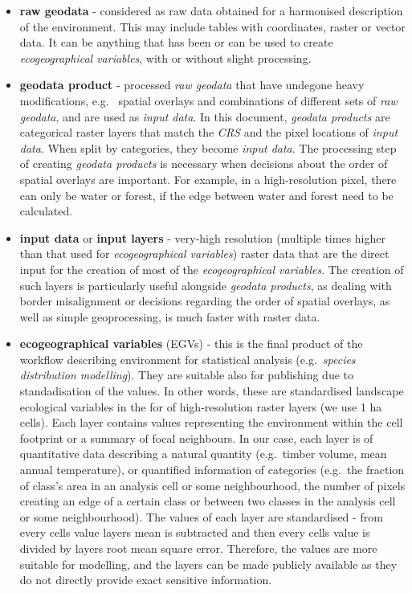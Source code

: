\documentclass[
]{book}
\begin{document}
\begin{itemize}
\item
  \textbf{raw geodata} - considered as raw data obtained for a harmonised description
  of the environment. This may include tables with coordinates, raster or vector data.
  It can be anything that has been or can be used to create \emph{ecogeographical variables},
  with or without slight processing.
\item
  \textbf{geodata product} - processed \emph{raw geodata} that have undegone heavy modifications, e.g.~
  spatial overlays and combinations of different sets of \emph{raw geodata}, and are used
  as \emph{input data}. In this document, \emph{geodata products} are categorical
  raster layers that match the \emph{CRS} and the pixel locations of \emph{input data}. When
  split by categories, they become \emph{input data}. The processing step of creating \emph{geodata products}
  is necessary when decisions about the order of spatial overlays are important. For example,
  in a high-resolution pixel, there can only be water or forest, if the edge between water and
  forest need to be calculated.
\item
  \textbf{input data} or \textbf{input layers} - very-high resolution (multiple times higher than that
  used for \emph{ecogeographical variables}) raster data that are the direct input for the creation
  of most of the \emph{ecogeographical variables}. The creation of such layers is particularly useful
  alongside \emph{geodata products}, as dealing with border misalignment or decisions regarding the
  order of spatial overlays, as well as simple geoprocessing, is much faster with raster
  data.
\item
  \textbf{ecogeographical variables} (EGVs) - this is the final product of the workflow
  describing environment for statistical analysis (e.g.~\emph{species distribution modelling}).
  They are suitable also for publishing due to standadisation of the values. In other
  words, these are standardised landscape ecological variables in the for of
  high-resolution raster layers (we use 1 ha cells). Each layer contains values
  representing the environment within the cell footprint or a summary of focal
  neighbours. In our case, each layer is of quantitative data describing a natural
  quantity (e.g.~timber volume, mean annual temperature), or quantified information of
  categories (e.g.~the fraction of class's area in an analysis cell or some neighbourhood,
  the number of pixels creating an edge of a certain class or between two classes in the
  analysis cell or some neighbourhood). The values of each layer are standardised - from
  every cells value layers mean is subtracted and then every cells value is divided
  by layers root mean square error. Therefore, the values are more suitable for
  modelling, and the layers can be made publicly available as they do not directly
  provide exact sensitive information.
\end{itemize}
\end{document}
